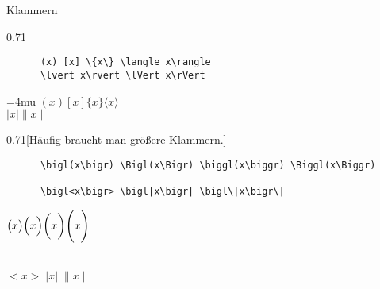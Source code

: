 \begin{frame}[fragile]{Klammern}
  \vspace{-1.5em}
  \begin{CodeExample}{0.71}
    \begin{lstlisting}
      (x) [x] \{x\} \langle x\rangle
      \lvert x\rvert \lVert x\rVert
    \end{lstlisting}
  \CodeResult
    \Umathcloseopenspacing\textstyle=4mu
    $(x) [x] \{x\} \langle x\rangle $\\
    $\lvert x\rvert \lVert x\rVert$
  \end{CodeExample}

  \begin{CodeExample}{0.71}[Häufig braucht man größere Klammern.]
    \begin{lstlisting}
      \bigl(x\bigr) \Bigl(x\Bigr) \biggl(x\biggr) \Biggl(x\Biggr)

      \bigl<x\bigr> \bigl|x\bigr| \bigl\|x\bigr\|
    \end{lstlisting}
  \CodeResult
    \begin{minipage}[c][2\baselineskip][c]{\textwidth}
      $\bigl(x\bigr) \Bigl(x\Bigr) \biggl(x\biggr) \Biggl(x\Biggr)$
    \end{minipage} \\[\baselineskip]\nointerlineskip
    $\bigl< x\bigr> \; \bigl|x\bigr| \; \bigl\|x\bigr\|$
  \end{CodeExample}
\end{frame}

